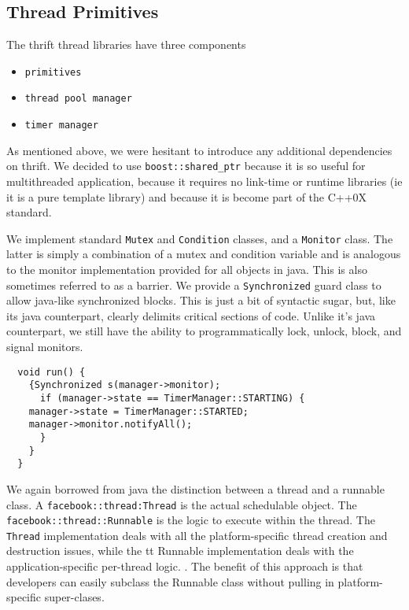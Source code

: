 \documentclass[nocopyrightspace,blockstyle]{sigplanconf}
\begin{document}
\subsection{Thread Primitives}

The thrift thread libraries have three components
\begin{itemize}
\item \texttt{primitives}
\item \texttt{thread pool manager}
\item \texttt{timer manager}
\end{itemize}

As mentioned above, we were hesitant to introduce any additional dependencies on 
thrift.  We decided to use {\tt boost::shared\_ptr} because it is so useful for
multithreaded application, because it requires no link-time or runtime libraries
(ie it is a pure template library) and because it is  become part of the C++0X 
standard.

We implement standard {\tt Mutex} and {\tt Condition} classes, and a
 {\tt Monitor} class.  The latter is simply a combination of a mutex and 
condition variable and is analogous to the monitor implementation provided for
all objects in java.  This is also sometimes referred to as a barrier.  We 
provide a {\tt Synchronized} guard class to allow java-like synchronized blocks.
This is just a bit of syntactic sugar, but, like its java counterpart, clearly 
delimits critical sections of code.  Unlike it's java counterpart, we still have
the ability to programmatically lock, unlock, block, and signal monitors.

\begin{verbatim}
  void run() {
    {Synchronized s(manager->monitor);
      if (manager->state == TimerManager::STARTING) {
	manager->state = TimerManager::STARTED;
	manager->monitor.notifyAll();
      }
    }
  }
\end{verbatim}

We again borrowed from java the distinction between a thread and a runnable
class.  A {\tt facebook::thread:Thread} is the actual schedulable object.  The
{\tt facebook::thread::Runnable} is the logic to execute within the thread. 
The {\tt Thread} implementation deals with all the platform-specific thread 
creation and destruction issues, while the {tt Runnable} implementation deals
with the application-specific per-thread logic. .  The benefit of this approach
is that developers can easily subclass the Runnable class without pulling in 
platform-specific super-clases.
\end{document}
